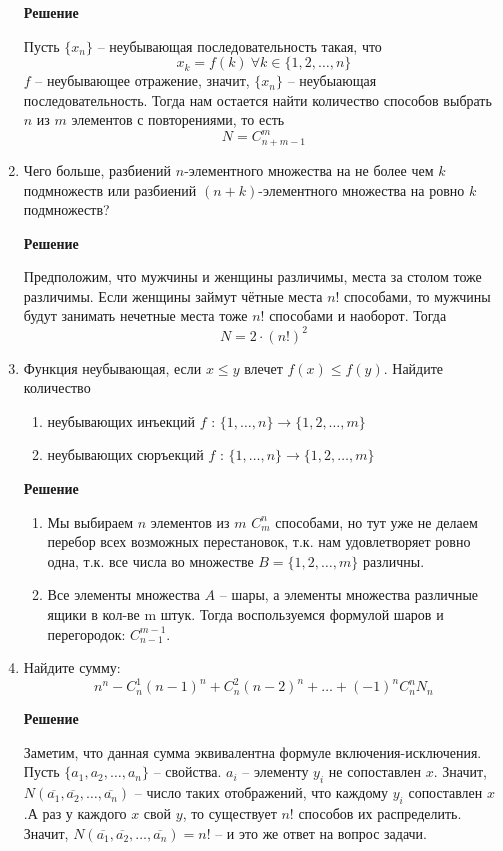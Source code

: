 \documentclass[12pt]{article}
\begin{document}
\begin{enumerate}[label={\textbf{\arabic{section}.\arabic*}}]
		\textbf{Решение}
		
		Пусть $\{x_n\}$ -- неубывающая последовательность такая, что 
		$$
		x_k = f(k)~\forall k\in\{1,2,\dots,n\}
		$$
		$f$ -- неубывающее отражение, значит, $\{x_n\}$ -- неубыающая последовательность. Тогда нам остается найти количество способов выбрать $n$ из $m$ элементов с повторениями, то есть
		$$
		N = C_{n+m-1}^{m}
		$$
		
		\item Чего больше, разбиений $n$-элементного множества на не более чем $k$ подмножеств или разбиений $(n+k)$-элементного множества на ровно $k$ подмножеств?
		
		\textbf{Решение}
		
		Предположим, что мужчины и женщины различимы, места за столом тоже различимы. Если женщины займут чётные места $n!$ способами, то мужчины будут занимать нечетные места тоже $n!$ способами и наоборот. Тогда
		$$
		N = 2\cdot(n!)^2
		$$
		
		\item Функция неубывающая, если $x \leq y$ влечет $f(x) \leq f(y)$. Найдите количество 
		\begin{enumerate}[label=\textbf{\alph*)}]
			\item неубывающих инъекций $f$ : $\{1,\dots,n\}\rightarrow\{1,2,\dots,m\}$
			\item неубывающих сюръекций $f$ : $\{1,\dots,n\}\rightarrow\{1,2,\dots,m\}$
		\end{enumerate}
	
		\textbf{Решение}
		\begin{enumerate}[label=\textbf{\alph*)}]
			\item Мы выбираем $n$ элементов из $m$ $C^n_m$ способами, но тут уже не делаем перебор всех возможных перестановок, т.к. нам удовлетворяет ровно одна, т.к. все числа во множестве $B = \{1,2,\dots,m\}$ различны.
			\item Все элементы множества $A$ -- шары, а элементы множества различные ящики в кол-ве m штук. Тогда воспользуемся формулой шаров и перегородок: $C^{m-1}_{n-1}$.
		\end{enumerate}
		
		\item Найдите сумму:
		$$
		n^n - C^1_n(n-1)^n+C^2_n(n-2)^n+\dots+(-1)^nC^n_nN_n
		$$
		
		\textbf{Решение}
		
		Заметим, что данная сумма эквивалентна формуле включения-исключения. Пусть $\{a_1,a_2,\dots,a_n\}$ -- свойства. $a_i$ -- элементу $y_i$ не сопоставлен $x$. Значит, $N(\overline{a_1},\overline{a_2},\dots,\overline{a_n})$ -- число таких отображений, что каждому $y_i$ сопоставлен $x$.А раз у каждого $x$ свой $y$, то существует $n!$ способов их распределить. Значит, $N(\overline{a_1},\overline{a_2},\dots,\overline{a_n}) = n!$ -- и это же ответ на вопрос задачи. 
	\end{enumerate}
	\newpage
\end{document}
